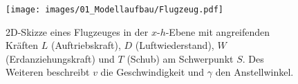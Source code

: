 \begin{figure}[H]
    \begin{center}
        \texttt{[image: images/01\_Modellaufbau/Flugzeug.pdf]}
        \caption{2D-Skizze eines Flugzeuges in der $x$-$h$-Ebene mit angreifenden Kräften $L$ (Auftriebskraft), $D$ (Luftwiederstand), $W$ (Erdanziehungskraft) und $T$ (Schub) am Schwerpunkt $S$. Des Weiteren beschreibt $v$ die Geschwindigkeit und $\gamma$ den Anstellwinkel.}\label{img:Flugzeug}
    \end{center}
\end{figure}


